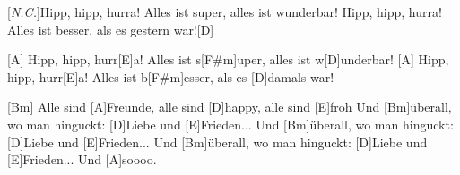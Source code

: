 \begin{guitar}
	\begin{highlightbar}
		[\textit{N.C.}]Hipp, hipp, hurra! Alles ist super, alles ist wunderbar!
		Hipp, hipp, hurra! Alles ist besser, als es gestern war![D]{}
		
		[A] Hipp, hipp, hurr[E]a! Alles ist s[F#m]uper, alles ist w[D]underbar!
		[A] Hipp, hipp, hurr[E]a! Alles ist b[F#m]esser, als es [D]damals war!
	\end{highlightbar}
	
	[Bm] Alle sind [A]Freunde, alle sind [D]happy, alle sind [E]froh
	Und [Bm]{ü}berall, wo man hinguckt: [D]Liebe und [E]Frieden...
	Und [Bm]{ü}berall, wo man hinguckt: [D]Liebe und [E]Frieden...
	Und [Bm]{ü}berall, wo man hinguckt: [D]Liebe und [E]Frieden...
	Und [A]soooo.
	
\end{guitar}